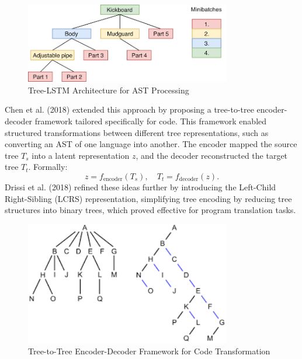 \documentclass{dhbenelux}
\begin{document}
\begin{figure}[h]
    \centering
    \includegraphics[width=0.8\textwidth]{Images/1.png} %
    \caption{Tree-LSTM Architecture for AST Processing}
    \label{fig:tree-lstm}
\end{figure}

Chen et al. (2018) extended this approach by proposing a tree-to-tree encoder-decoder framework tailored specifically for code. This framework enabled structured transformations between different tree representations, such as converting an AST of one language into another. The encoder mapped the source tree \( T_s \) into a latent representation \( z \), and the decoder reconstructed the target tree \( T_t \). Formally:
\[
z = f_{\text{encoder}}(T_s), \quad T_t = f_{\text{decoder}}(z).
\]
Drissi et al. (2018) refined these ideas further by introducing the Left-Child Right-Sibling (LCRS) representation, simplifying tree encoding by reducing tree structures into binary trees, which proved effective for program translation tasks.

\begin{figure}[h]
    \centering
    \includegraphics[width=0.8\textwidth]{Images/2.png} %
    \caption{Tree-to-Tree Encoder-Decoder Framework for Code Transformation}
    \label{fig:tree-encoder-decoder}
\end{figure}
\end{document}
